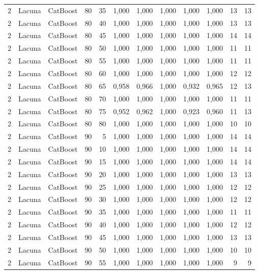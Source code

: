 \begin{longtable}{ccclrrrrrrrr}
2 & Lacuna & CatBoost & 80 & 35 & 1,000 & 1,000 & 1,000 & 1,000 & 1,000 & 13 & 13 \\
2 & Lacuna & CatBoost & 80 & 40 & 1,000 & 1,000 & 1,000 & 1,000 & 1,000 & 13 & 13 \\
2 & Lacuna & CatBoost & 80 & 45 & 1,000 & 1,000 & 1,000 & 1,000 & 1,000 & 14 & 14 \\
2 & Lacuna & CatBoost & 80 & 50 & 1,000 & 1,000 & 1,000 & 1,000 & 1,000 & 11 & 11 \\
2 & Lacuna & CatBoost & 80 & 55 & 1,000 & 1,000 & 1,000 & 1,000 & 1,000 & 11 & 11 \\
2 & Lacuna & CatBoost & 80 & 60 & 1,000 & 1,000 & 1,000 & 1,000 & 1,000 & 12 & 12 \\
2 & Lacuna & CatBoost & 80 & 65 & 0,958 & 0,966 & 1,000 & 0,932 & 0,965 & 12 & 13 \\
2 & Lacuna & CatBoost & 80 & 70 & 1,000 & 1,000 & 1,000 & 1,000 & 1,000 & 11 & 11 \\
2 & Lacuna & CatBoost & 80 & 75 & 0,952 & 0,962 & 1,000 & 0,923 & 0,960 & 11 & 13 \\
2 & Lacuna & CatBoost & 80 & 80 & 1,000 & 1,000 & 1,000 & 1,000 & 1,000 & 10 & 10 \\
2 & Lacuna & CatBoost & 90 & 5 & 1,000 & 1,000 & 1,000 & 1,000 & 1,000 & 14 & 14 \\
2 & Lacuna & CatBoost & 90 & 10 & 1,000 & 1,000 & 1,000 & 1,000 & 1,000 & 14 & 14 \\
2 & Lacuna & CatBoost & 90 & 15 & 1,000 & 1,000 & 1,000 & 1,000 & 1,000 & 14 & 14 \\
2 & Lacuna & CatBoost & 90 & 20 & 1,000 & 1,000 & 1,000 & 1,000 & 1,000 & 13 & 13 \\
2 & Lacuna & CatBoost & 90 & 25 & 1,000 & 1,000 & 1,000 & 1,000 & 1,000 & 12 & 12 \\
2 & Lacuna & CatBoost & 90 & 30 & 1,000 & 1,000 & 1,000 & 1,000 & 1,000 & 12 & 12 \\
2 & Lacuna & CatBoost & 90 & 35 & 1,000 & 1,000 & 1,000 & 1,000 & 1,000 & 11 & 11 \\
2 & Lacuna & CatBoost & 90 & 40 & 1,000 & 1,000 & 1,000 & 1,000 & 1,000 & 12 & 12 \\
2 & Lacuna & CatBoost & 90 & 45 & 1,000 & 1,000 & 1,000 & 1,000 & 1,000 & 13 & 13 \\
2 & Lacuna & CatBoost & 90 & 50 & 1,000 & 1,000 & 1,000 & 1,000 & 1,000 & 10 & 10 \\
2 & Lacuna & CatBoost & 90 & 55 & 1,000 & 1,000 & 1,000 & 1,000 & 1,000 & 9 & 9 \\

\end{longtable}

